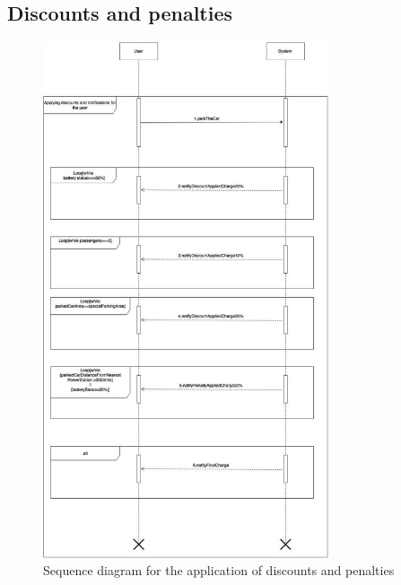 \subsection{Discounts and penalties}
\begin{figure}[h]
\centering
\includegraphics[height=15.2cm,keepaspectratio]{figures/sequence_discounts_penalties.eps}
\caption{Sequence diagram for the application of discounts and penalties}
\label{fig:sequence_discounts_penalties}
\end{figure}